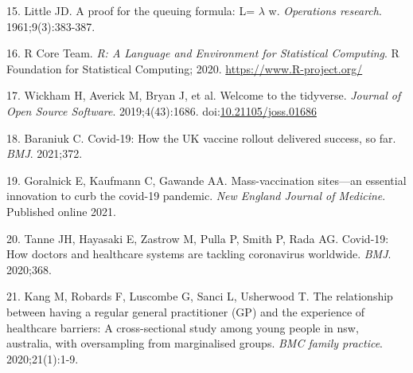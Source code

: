 \documentclass{article}
\begin{document}
\leavevmode\hypertarget{ref-little1961proof}{}%
15. Little JD. A proof for the queuing formula: L= \(\lambda\) w.
\emph{Operations research}. 1961;9(3):383-387.

\leavevmode\hypertarget{ref-R-base}{}%
16. R Core Team. \emph{R: A Language and Environment for Statistical
Computing}. R Foundation for Statistical Computing; 2020.
\url{https://www.R-project.org/}

\leavevmode\hypertarget{ref-tidyverse2019}{}%
17. Wickham H, Averick M, Bryan J, et al. Welcome to the tidyverse.
\emph{Journal of Open Source Software}. 2019;4(43):1686.
doi:\href{https://doi.org/10.21105/joss.01686}{10.21105/joss.01686}

\leavevmode\hypertarget{ref-baraniuk2021covid}{}%
18. Baraniuk C. Covid-19: How the UK vaccine rollout delivered success,
so far. \emph{BMJ}. 2021;372.

\leavevmode\hypertarget{ref-goralnick2021mass}{}%
19. Goralnick E, Kaufmann C, Gawande AA. Mass-vaccination sites---an
essential innovation to curb the covid-19 pandemic. \emph{New England
Journal of Medicine}. Published online 2021.

\leavevmode\hypertarget{ref-tanne2020covid}{}%
20. Tanne JH, Hayasaki E, Zastrow M, Pulla P, Smith P, Rada AG.
Covid-19: How doctors and healthcare systems are tackling coronavirus
worldwide. \emph{BMJ}. 2020;368.

\leavevmode\hypertarget{ref-kang2020relationship}{}%
21. Kang M, Robards F, Luscombe G, Sanci L, Usherwood T. The
relationship between having a regular general practitioner (GP) and the
experience of healthcare barriers: A cross-sectional study among young
people in nsw, australia, with oversampling from marginalised groups.
\emph{BMC family practice}. 2020;21(1):1-9.



\end{document}
